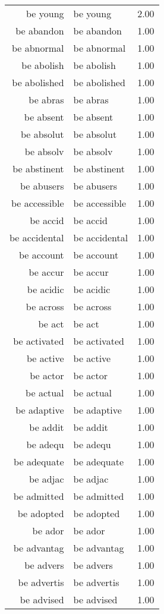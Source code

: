 \begin{table}[ht]
\begin{tabular}{rlr}
  be young & be young & 2.00 \\ 
  be abandon & be abandon & 1.00 \\ 
  be abnormal & be abnormal & 1.00 \\ 
  be abolish & be abolish & 1.00 \\ 
  be abolished & be abolished & 1.00 \\ 
  be abras & be abras & 1.00 \\ 
  be absent & be absent & 1.00 \\ 
  be absolut & be absolut & 1.00 \\ 
  be absolv & be absolv & 1.00 \\ 
  be abstinent & be abstinent & 1.00 \\ 
  be abusers & be abusers & 1.00 \\ 
  be accessible & be accessible & 1.00 \\ 
  be accid & be accid & 1.00 \\ 
  be accidental & be accidental & 1.00 \\ 
  be account & be account & 1.00 \\ 
  be accur & be accur & 1.00 \\ 
  be acidic & be acidic & 1.00 \\ 
  be across & be across & 1.00 \\ 
  be act & be act & 1.00 \\ 
  be activated & be activated & 1.00 \\ 
  be active & be active & 1.00 \\ 
  be actor & be actor & 1.00 \\ 
  be actual & be actual & 1.00 \\ 
  be adaptive & be adaptive & 1.00 \\ 
  be addit & be addit & 1.00 \\ 
  be adequ & be adequ & 1.00 \\ 
  be adequate & be adequate & 1.00 \\ 
  be adjac & be adjac & 1.00 \\ 
  be admitted & be admitted & 1.00 \\ 
  be adopted & be adopted & 1.00 \\ 
  be ador & be ador & 1.00 \\ 
  be advantag & be advantag & 1.00 \\ 
  be advers & be advers & 1.00 \\ 
  be advertis & be advertis & 1.00 \\ 
  be advised & be advised & 1.00 \\ 

\end{tabular}
\end{table}
